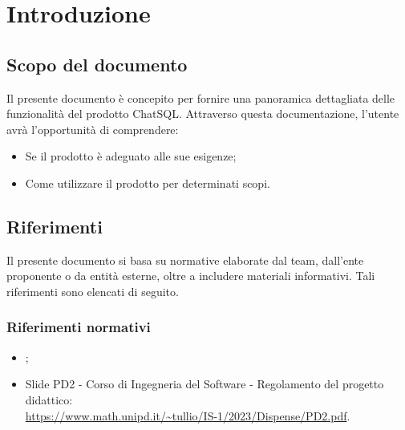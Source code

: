 \section{Introduzione}
\label{sec:introduzione}

\subsection{Scopo del documento}
\par Il presente documento è concepito per fornire una panoramica dettagliata delle funzionalità del prodotto ChatSQL. Attraverso questa documentazione, l'utente avrà l'opportunità di comprendere:
\begin{itemize}
  \item Se il prodotto è adeguato alle sue esigenze;
  \item Come utilizzare il prodotto per determinati scopi.
\end{itemize}

\subsection{Riferimenti}
\par Il presente documento si basa su normative elaborate dal team, dall'ente proponente o da entità esterne, oltre a includere materiali informativi. Tali riferimenti sono elencati di seguito.

\subsubsection{Riferimenti normativi}
\begin{itemize}
  \item \NormeDiProgetto;
  \item Slide PD2 - Corso di Ingegneria del Software - Regolamento del progetto didattico:\\ \href{https://www.math.unipd.it/~tullio/IS-1/2023/Dispense/PD2.pdf}{https://www.math.unipd.it/\textasciitilde tullio/IS-1/2023/Dispense/PD2.pdf}.
\end{itemize}

